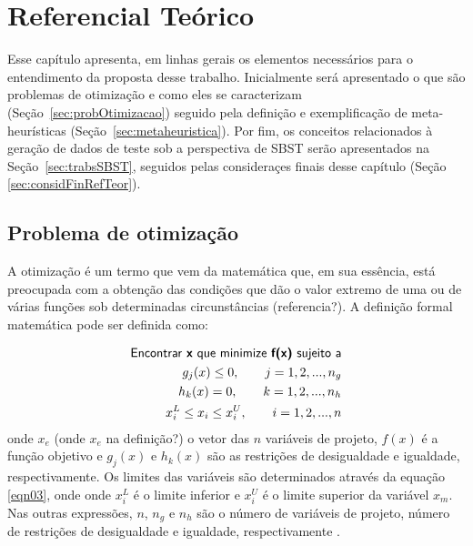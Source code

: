 \chapter[Referencial Teórico]{Referencial Teórico} \label{referencialteorico} 
Esse capítulo apresenta, em linhas gerais os elementos necessários para o entendimento da proposta desse trabalho. Inicialmente será apresentado o que são problemas de otimização e como eles se caracterizam (Seção~\ref{sec:probOtimizacao}) seguido pela definição e exemplificação de meta-heurísticas (Seção~\ref{sec:metaheuristica}). Por fim, os conceitos relacionados à geração de dados de teste sob a perspectiva de SBST serão apresentados na Seção~\ref{sec:trabsSBST}, seguidos pelas consideraçes finais desse capítulo (Seção \ref{sec:considFinRefTeor}).  




\section{Problema de otimização \label{sec:probOtimizacao}}

A otimização é um termo que vem da matemática que, em sua essência, está
preocupada com a obtenção das condições que dão o valor extremo de uma ou de
várias funções sob determinadas circunstâncias (referencia?). A definição formal
matemática pode ser definida como: 

\begin{eqnarray}
\label{eqn01}
	 \textsf{Encontrar \textbf{x} que minimize \textbf{f(x)} sujeito a} \nonumber \\
     g_j(x) \leq 0, \qquad j = 1, 2, ..., n_g \\
\label{eqn02}
      h_k(x) = 0, \qquad k = 1, 2, ..., n_h \\
\label{eqn03}
      x_{i}^{L} \leq x_i \leq x_{i}^{U}, \qquad i = 1, 2, ..., n 
\end{eqnarray}
onde $x_{e}$ (onde $x_e$ na definição?) o vetor das $n$ variáveis de projeto, $f(x)$ é a função objetivo e $g_{j}(x)$ e $h_{k}(x)$ são as restrições de desigualdade e igualdade, respectivamente. Os limites das variáveis são determinados através da equação \ref{eqn03}, onde onde $x_{i}^{L}$ é o limite inferior e $x_{i}^{U}$ é o limite superior da variável $x_{m}$. Nas outras expressões, $n$, $n_{g}$ e $n_{h}$ são o número de variáveis de projeto, número de restrições de desigualdade e igualdade, respectivamente \cite{gandomi2013metaheuristic}.  

